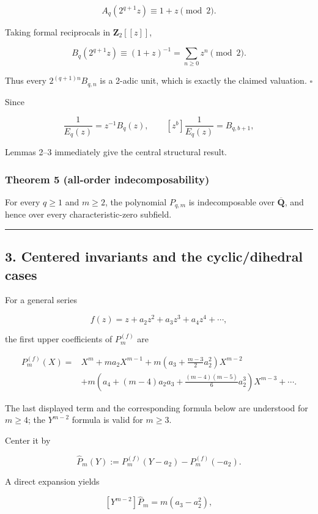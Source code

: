 \documentclass[11pt]{article}
\theoremstyle{keio}
\theoremstyle{definition}
\theoremstyle{remark}
\begin{document}
\[
 A_q(2^{q+1}z)\equiv1+z\pmod2.
\]

Taking formal reciprocals in \(\mathbf Z_2[[z]]\),

\[
 B_q(2^{q+1}z)
 \equiv(1+z)^{-1}
 =\sum_{n\geq0}z^n\pmod2.
\]

Thus every \(2^{(q+1)n}B_{q,n}\) is a 2-adic unit, which is exactly the
claimed valuation. \(\square\)

Since

\[
 \frac1{E_q(z)}=z^{-1}B_q(z),
 \qquad
 [z^b]\frac1{E_q(z)}=B_{q,b+1},
\]

Lemmas 2--3 immediately give the central structural result.

\subsubsection{Theorem 5 (all-order indecomposability)}

For every \(q\geq1\) and \(m\geq2\), the polynomial \(P_{q,m}\) is
indecomposable over \(\overline{\mathbf Q}\), and hence over every
characteristic-zero subfield.

\begin{center}\rule{0.5\linewidth}{0.5pt}\end{center}

\subsection{3. Centered invariants and the cyclic/dihedral cases}

For a general series

\[
 f(z)=z+a_2z^2+a_3z^3+a_4z^4+\cdots,
\]

the first upper coefficients of \(P_m^{(f)}\) are

\[
\begin{aligned}
P_m^{(f)}(X)={}&X^m+ma_2X^{m-1}
 +m\left(a_3+\frac{m-3}{2}a_2^2\right)X^{m-2}\\
&+m\left(a_4+(m-4)a_2a_3
 +\frac{(m-4)(m-5)}6a_2^3\right)X^{m-3}+\cdots .
\end{aligned}
\]

The last displayed term and the corresponding formula below are understood
for \(m\ge4\); the \(Y^{m-2}\) formula is valid for \(m\ge3\).

Center it by

\[
 \widehat P_m(Y):=P_m^{(f)}(Y-a_2)-P_m^{(f)}(-a_2).
\]

A direct expansion yields

\[
 [Y^{m-2}]\widehat P_m=m(a_3-a_2^2),
\]
\end{document}
